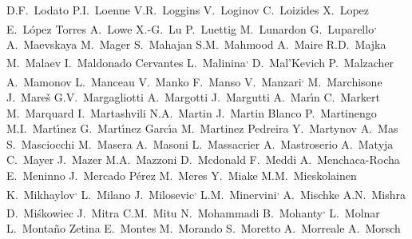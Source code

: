 \begin{flushleft}
D.F.~Lodato\And
P.I.~Loenne\And
V.R.~Loggins\And
V.~Loginov\And
C.~Loizides\And
X.~Lopez\And
E.~L\'{o}pez Torres\And
A.~Lowe\And
X.-G.~Lu\And
P.~Luettig\And
M.~Lunardon\And
G.~Luparello\textsuperscript{,}\And
A.~Maevskaya\And
M.~Mager\And
S.~Mahajan\And
S.M.~Mahmood\And
A.~Maire\And
R.D.~Majka\And
M.~Malaev\And
I.~Maldonado Cervantes\And
L.~Malinina\textsuperscript{,}\And
D.~Mal'Kevich\And
P.~Malzacher\And
A.~Mamonov\And
L.~Manceau\And
V.~Manko\And
F.~Manso\And
V.~Manzari\textsuperscript{,}\And
M.~Marchisone\And
J.~Mare\v{s}\And
G.V.~Margagliotti\And
A.~Margotti\And
J.~Margutti\And
A.~Mar\'{\i}n\And
C.~Markert\And
M.~Marquard\And
I.~Martashvili\And
N.A.~Martin\And
J.~Martin Blanco\And
P.~Martinengo\And
M.I.~Mart\'{\i}nez\And
G.~Mart\'{\i}nez Garc\'{\i}a\And
M.~Martinez Pedreira\And
Y.~Martynov\And
A.~Mas\And
S.~Masciocchi\And
M.~Masera\And
A.~Masoni\And
L.~Massacrier\And
A.~Mastroserio\And
A.~Matyja\And
C.~Mayer\And
J.~Mazer\And
M.A.~Mazzoni\And
D.~Mcdonald\And
F.~Meddi\And
A.~Menchaca-Rocha\And
E.~Meninno\And
J.~Mercado P\'erez\And
M.~Meres\And
Y.~Miake\And
M.M.~Mieskolainen\And
K.~Mikhaylov\textsuperscript{,}\And
L.~Milano\And
J.~Milosevic\textsuperscript{,}\And
L.M.~Minervini\textsuperscript{,}\And
A.~Mischke\And
A.N.~Mishra\And
D.~Mi\'{s}kowiec\And
J.~Mitra\And
C.M.~Mitu\And
N.~Mohammadi\And
B.~Mohanty\textsuperscript{,}\And
L.~Molnar\And
L.~Monta\~{n}o Zetina\And
E.~Montes\And
M.~Morando\And
S.~Moretto\And
A.~Morreale\And
A.~Morsch\And

\end{flushleft}
